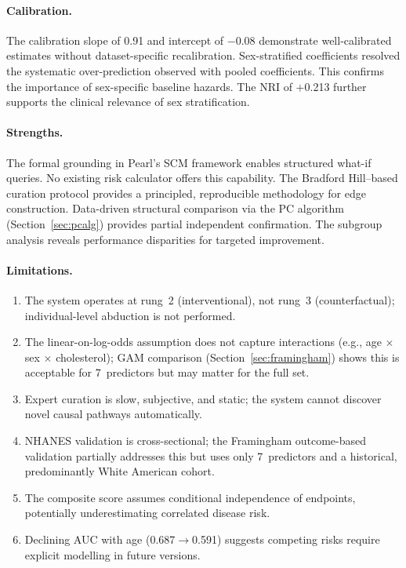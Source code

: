 \documentclass[runningheads]{llncs}
\begin{document}
\paragraph{Calibration.}
The calibration slope of 0.91 and intercept of $-$0.08 demonstrate
well-calibrated estimates without dataset-specific recalibration.
Sex-stratified coefficients resolved the systematic over-prediction
observed with pooled coefficients.
This confirms the importance of sex-specific baseline hazards.
The NRI of $+$0.213 further supports the clinical relevance of
sex stratification.

\paragraph{Strengths.}
The formal grounding in Pearl's SCM framework enables structured
what-if queries.
No existing risk calculator offers this capability.
The Bradford Hill--based curation protocol provides a principled,
reproducible methodology for edge construction.
Data-driven structural comparison via the PC algorithm
(Section~\ref{sec:pcalg}) provides partial independent confirmation.
The subgroup analysis reveals performance disparities for targeted
improvement.

\paragraph{Limitations.}
\begin{enumerate}
\item The system operates at rung~2 (interventional), not rung~3
  (counterfactual); individual-level abduction is not performed.
\item The linear-on-log-odds assumption does not capture interactions
  (e.g., age $\times$ sex $\times$ cholesterol); GAM comparison
  (Section~\ref{sec:framingham}) shows this is acceptable for
  7~predictors but may matter for the full set.
\item Expert curation is slow, subjective, and static; the system
  cannot discover novel causal pathways automatically.
\item NHANES validation is cross-sectional; the Framingham
  outcome-based validation partially addresses this but uses only
  7~predictors and a historical, predominantly White American cohort.
\item The composite score assumes conditional independence of
  endpoints, potentially underestimating correlated disease risk.
\item Declining AUC with age (0.687$\rightarrow$0.591) suggests
  competing risks require explicit modelling in future versions.
\end{enumerate}
\end{document}
